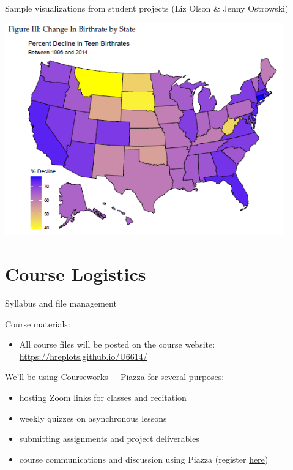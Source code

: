 \documentclass[
  8pt,
  ignorenonframetext,
  dvipsnames]{beamer}
\providecommand{\tightlist}{%
  \setlength{\itemsep}{0pt}\setlength{\parskip}{0pt}}
\let\olditem\item
\renewcommand{\item}{%
  \olditem\vspace{4pt}
}
\begin{document}
\begin{frame}{Sample visualizations from student projects (Liz Olson \&
Jenny Ostrowski)}
\protect\hypertarget{sample-visualizations-from-student-projects-liz-olson-jenny-ostrowski}{}

\includegraphics[width=0.9\textwidth,height=\textheight]{lo_jo_map1.PNG}

\end{frame}

\hypertarget{course-logistics}{%
\section{Course Logistics}\label{course-logistics}}

\begin{frame}{Syllabus and file management}
\protect\hypertarget{syllabus-and-file-management}{}

Course materials:

\begin{itemize}
\tightlist
\item
  All course files will be posted on the course website:
  \url{https://hreplots.github.io/U6614/}
\end{itemize}

\medskip

We'll be using Courseworks + Piazza for several purposes:

\begin{itemize}
\tightlist
\item
  hosting Zoom links for classes and recitation
\item
  weekly quizzes on asynchronous lessons
\item
  submitting assignments and project deliverables
\item
  course communications and discussion using Piazza (register
  \href{https://piazza.com/demo_login?nid=keiqq7y84rt5y2\&auth=6c81e06}{here})
\end{itemize}

\medskip

\end{frame}
\end{document}
